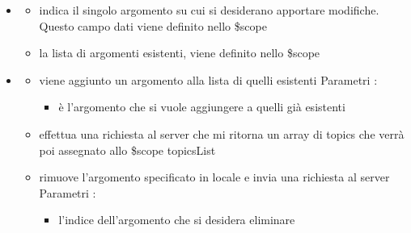 \begin{itemize}
\item {}
\begin{itemize}
\item {}
\newline
indica il singolo argomento su cui si desiderano apportare modifiche. Questo campo dati viene definito nello \$scope
\item {}
\newline
la lista di argomenti esistenti, viene definito nello \$scope
\end{itemize}
\item {}
\begin{itemize}
\item {}
\newline
viene aggiunto un argomento alla lista di quelli esistenti
\newline
Parametri :
\begin{itemize}
\item {}
\newline
è l'argomento che si vuole aggiungere a quelli già esistenti
\end{itemize}
\item {}
\newline
effettua una richiesta al server che mi ritorna un array di topics che verrà poi assegnato allo \$scope topicsList
\newline
\item {}
\newline
rimuove l'argomento specificato in locale e invia una richiesta al server
\newline
Parametri :
\begin{itemize}
\item {}
\newline
l'indice dell'argomento che si desidera eliminare
\end{itemize}
\end{itemize}
\end{itemize}
